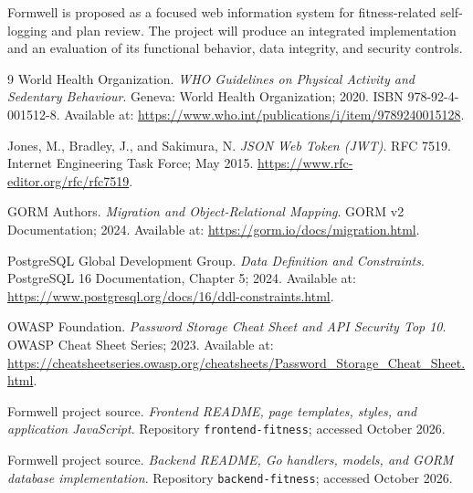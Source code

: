 \documentclass[11pt,a4paper]{report}
\begin{document}
Formwell is proposed as a focused web information system for fitness-related self-logging and plan review. The project will produce an integrated implementation and an evaluation of its functional behavior, data integrity, and security controls.

\begin{thebibliography}{9}
World Health Organization. \emph{WHO Guidelines on Physical Activity and Sedentary Behaviour}. Geneva: World Health Organization; 2020. ISBN 978-92-4-001512-8. Available at: \url{https://www.who.int/publications/i/item/9789240015128}.

Jones, M., Bradley, J., and Sakimura, N. \emph{JSON Web Token (JWT)}. RFC 7519. Internet Engineering Task Force; May 2015. \url{https://www.rfc-editor.org/rfc/rfc7519}.

GORM Authors. \emph{Migration and Object-Relational Mapping}. GORM v2 Documentation; 2024. Available at: \url{https://gorm.io/docs/migration.html}.

PostgreSQL Global Development Group. \emph{Data Definition and Constraints}. PostgreSQL 16 Documentation, Chapter 5; 2024. Available at: \url{https://www.postgresql.org/docs/16/ddl-constraints.html}.

OWASP Foundation. \emph{Password Storage Cheat Sheet and API Security Top 10}. OWASP Cheat Sheet Series; 2023. Available at: \url{https://cheatsheetseries.owasp.org/cheatsheets/Password_Storage_Cheat_Sheet.html}.

Formwell project source. \emph{Frontend README, page templates, styles, and application JavaScript}. Repository \texttt{frontend-fitness}; accessed October 2026.

Formwell project source. \emph{Backend README, Go handlers, models, and GORM database implementation}. Repository \texttt{backend-fitness}; accessed October 2026.
\end{thebibliography}
\end{document}

